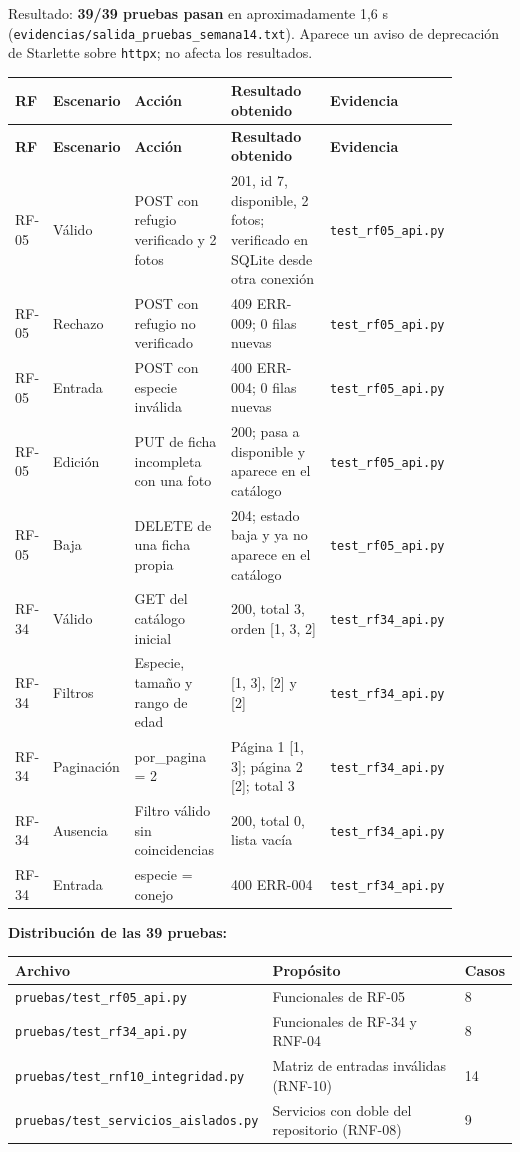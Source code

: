 \documentclass[11pt,a4paper]{article}
\newcommand{\code}[1]{\texttt{#1}}
\newcommand{\thead}[1]{\textbf{#1}}
\begin{document}
Resultado: \textbf{39/39 pruebas pasan} en aproximadamente 1,6 s
(\code{evidencias/salida\_pruebas\_semana14.txt}). Aparece un aviso de
deprecación de Starlette sobre \code{httpx}; no afecta los resultados.

{\footnotesize
\begin{longtable}{@{}A{0.06\linewidth}L{0.12\linewidth}L{0.23\linewidth}L{0.29\linewidth}L{0.18\linewidth}@{}}
\toprule
\thead{RF} & \thead{Escenario} & \thead{Acción} & \thead{Resultado obtenido} &
\thead{Evidencia} \\ \midrule \endfirsthead
\thead{RF} & \thead{Escenario} & \thead{Acción} & \thead{Resultado obtenido} &
\thead{Evidencia} \\ \midrule \endhead
\bottomrule
\endlastfoot
RF-05 & Válido & POST con refugio verificado y 2 fotos &
201, id 7, disponible, 2 fotos; verificado en SQLite desde otra conexión &
\code{test\_rf05\_api.py} \\
RF-05 & Rechazo & POST con refugio no verificado &
409 ERR-009; 0 filas nuevas & \code{test\_rf05\_api.py} \\
RF-05 & Entrada & POST con especie inválida &
400 ERR-004; 0 filas nuevas & \code{test\_rf05\_api.py} \\
RF-05 & Edición & PUT de ficha incompleta con una foto &
200; pasa a disponible y aparece en el catálogo & \code{test\_rf05\_api.py} \\
RF-05 & Baja & DELETE de una ficha propia &
204; estado baja y ya no aparece en el catálogo & \code{test\_rf05\_api.py} \\
RF-34 & Válido & GET del catálogo inicial &
200, total 3, orden [1, 3, 2] & \code{test\_rf34\_api.py} \\
RF-34 & Filtros & Especie, tamaño y rango de edad &
[1, 3], [2] y [2] & \code{test\_rf34\_api.py} \\
RF-34 & Paginación & por\_pagina = 2 &
Página 1 [1, 3]; página 2 [2]; total 3 & \code{test\_rf34\_api.py} \\
RF-34 & Ausencia & Filtro válido sin coincidencias &
200, total 0, lista vacía & \code{test\_rf34\_api.py} \\
RF-34 & Entrada & especie = conejo &
400 ERR-004 & \code{test\_rf34\_api.py} \\
\end{longtable}
}

\textbf{Distribución de las 39 pruebas:}

{\footnotesize
\begin{tabularx}{\linewidth}{@{}V{1.4}V{1.1}V{0.5}@{}}
\toprule
\thead{Archivo} & \thead{Propósito} & \thead{Casos} \\ \midrule
\code{pruebas/test\_rf05\_api.py} & Funcionales de RF-05 & 8 \\
\code{pruebas/test\_rf34\_api.py} & Funcionales de RF-34 y RNF-04 & 8 \\
\code{pruebas/test\_rnf10\_integridad.py} & Matriz de entradas inválidas
(RNF-10) & 14 \\
\code{pruebas/test\_servicios\_aislados.py} & Servicios con doble del
repositorio (RNF-08) & 9 \\
\bottomrule
\end{tabularx}
}
\end{document}
